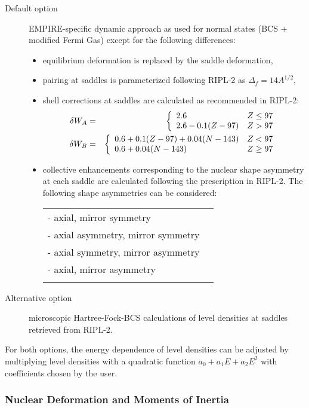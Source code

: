 \begin{description}
\item[Default option] EMPIRE-specific dynamic approach as used for normal
states (BCS + modified Fermi Gas) except for the following differences:

\begin{itemize}
\item equilibrium deformation is replaced by the saddle deformation,

\item pairing at saddles is parameterized following RIPL-2 as $%
\Delta_{f}=14A^{1/2}$,

\item shell corrections at saddles are calculated as recommended in RIPL-2:
\begin{eqnarray}
\delta W_{A}&=&\left\{
\begin{array}{lr}
2.6 & Z\leq97 \\
2.6-0.1(Z-97) & Z>97%
\end{array}%
\right.  \notag \\
\delta W_{B}&=&\left\{
\begin{array}{lr}
0.6+0.1(Z-97)+0.04(N-143) & Z<97 \\
0.6+0.04(N-143) & Z\geq97%
\end{array}%
\right.  \notag
\end{eqnarray}

\item collective enhancements corresponding to the nuclear shape asymmetry
at each saddle are calculated following the prescription in RIPL-2. The
following shape asymmetries can be considered:
\begin{tabular}{ll}
- axial, mirror symmetry\tabularnewline - axial asymmetry, mirror symmetry%
\tabularnewline - axial symmetry, mirror asymmetry\tabularnewline - axial,
mirror asymmetry \tabularnewline &
\end{tabular}
\end{itemize}

\item[Alternative option] microscopic Hartree-Fock-BCS calculations of level
densities at saddles retrieved from RIPL-2.
\end{description}

For both options, the energy dependence of level densities can be adjusted
by multiplying level densities with a quadratic function $%
a_{0}+a_{1}E+a_{2}E^{2}$ with coefficients chosen by the user.

\subsubsection{Nuclear Deformation and Moments of Inertia\label{sec: defor}}


